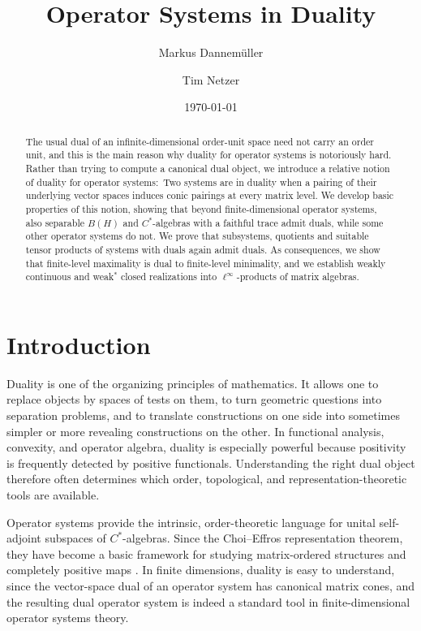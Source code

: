 \documentclass[11pt,onecolumn]{article}
\title{Operator Systems in Duality}
\author[]{Markus Dannemüller}
\author[]{Tim Netzer}
\affil[]{Department of Mathematics, University of Innsbruck}
\date{\today}
\theoremstyle{plain}
\theoremstyle{definition}
\begin{document}
\maketitle

\begin{abstract}
The usual dual of an infinite-dimensional order-unit space need not
carry an order unit, and this is the main reason why duality for operator systems is notoriously hard.
Rather than trying to compute a canonical dual object, we introduce a relative
notion of duality for operator systems:\ Two systems are in duality when a pairing of their underlying vector spaces induces
conic pairings at every matrix level.  We develop basic
properties of this notion, showing that beyond finite-dimensional operator systems, also separable
$B(H)$ and $C^*$-algebras with a faithful trace admit duals, while some other operator systems do not.  We prove that
subsystems, quotients and suitable tensor products of systems with duals again admit duals. As
consequences, we show that finite-level maximality is dual to finite-level minimality, and
we establish weakly continuous and weak$^*$ closed realizations into $\ell^\infty$-products of
matrix algebras.
\end{abstract}


\section{Introduction}

Duality is one of the organizing principles of mathematics.  It allows one to
replace objects by spaces of tests on them, to turn geometric questions into
separation problems, and to translate constructions on one side into sometimes
simpler or more revealing constructions on the other.  In functional analysis,
convexity, and operator algebra, duality is especially powerful because
positivity is frequently detected by positive functionals.  Understanding the
right dual object therefore often determines
which order, topological, and representation-theoretic tools are available.

Operator systems provide the intrinsic, order-theoretic language for
unital self-adjoint subspaces of $C^*$-algebras.  Since the Choi--Effros
representation theorem, they have become a basic framework for studying
matrix-ordered structures and completely positive maps \cite{ChoiEffros1977,Paulsen2002}.
In finite
dimensions, duality is easy to understand, since  the vector-space dual of an operator
system has canonical matrix cones, and the resulting dual operator system is indeed a
standard tool in finite-dimensional operator systems theory.
\end{document}
